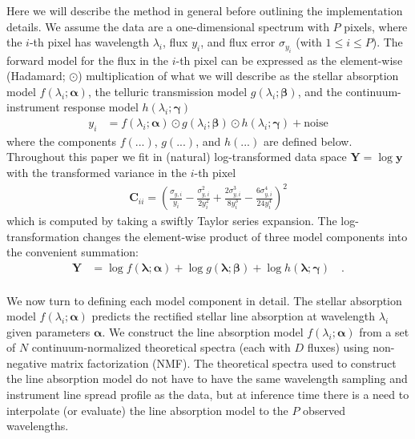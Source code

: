\documentclass[modern]{aastex631}
\renewcommand{\vec}[1]{\mathbf{#1}}
\newcommand{\vecalpha}{\boldsymbol{\alpha}}
\newcommand{\vecbeta}{\boldsymbol{\beta}}
\newcommand{\vecgamma}{\boldsymbol{\gamma}}
\newcommand{\hadamard}{\odot}
\begin{document}

Here we will describe the method in general before outlining the implementation details. We assume the data are a one-dimensional spectrum with $P$ pixels, where the $i$-th pixel has wavelength $\lambda_i$, flux $y_i$, and flux error $\sigma_{y_i}$ (with $1 \leq i \leq P$). The forward model for the flux in the $i$-th pixel can be expressed as the element-wise (Hadamard; $\hadamard$) multiplication of what we will describe as the stellar absorption model $f(\lambda_i; \vecalpha)$, the telluric transmission model $g(\lambda_i; \vecbeta)$, and the continuum-instrument response model $h(\lambda_i;\vecgamma)$
\begin{align}\label{eq:y}
    y_i &= f(\lambda_i;\vecalpha)\hadamard{}g(\lambda_i;\vecbeta)\hadamard{}h(\lambda_i;\vecgamma) + \mbox{noise}
\end{align}
where the components $f(...)$, $g(...)$, and $h(...)$ are defined below. Throughout this paper we fit in (natural) log-transformed data space $\vec{Y} = \log{\vec{y}}$ with the transformed variance in the $i$-th pixel
\begin{eqnarray}
    \vec{C}_{ii} = \left(\frac{\sigma_{y,i}}{y_i} - \frac{\sigma_{y,i}^2}{2y_i^2} + \frac{2\sigma_{y,i}^3}{8y_i^3} - \frac{6\sigma_{y,i}^4}{24y_i^4}\right)^2
\end{eqnarray}
\noindent{}which is computed by taking a swiftly Taylor series expansion. The log-transformation changes the element-wise product of three model components into the convenient summation:
\begin{align}
    \label{eq:log_y}
    \vec{Y} &= \log{f(\vec{\lambda}; \vecalpha)} + \log{g(\vec{\lambda};\vecbeta)} + \log{h(\vec{\lambda};\vecgamma)} \quad .
\end{align}\\

We now turn to defining each model component in detail.
The stellar absorption model $f(\lambda_i;\vecalpha)$ predicts the rectified stellar line absorption at wavelength $\lambda_i$ given parameters $\vecalpha$. We construct the line absorption model $f(\lambda_i;\vecalpha)$ from a set of $N$ continuum-normalized theoretical spectra (each with $D$ fluxes) using non-negative matrix factorization (NMF).
The theoretical spectra used to construct the line absorption model do not have to have the same wavelength sampling and instrument line spread profile as the data, but at inference time there is a need to interpolate (or evaluate) the line absorption model to the $P$ observed wavelengths.\\
\end{document}
